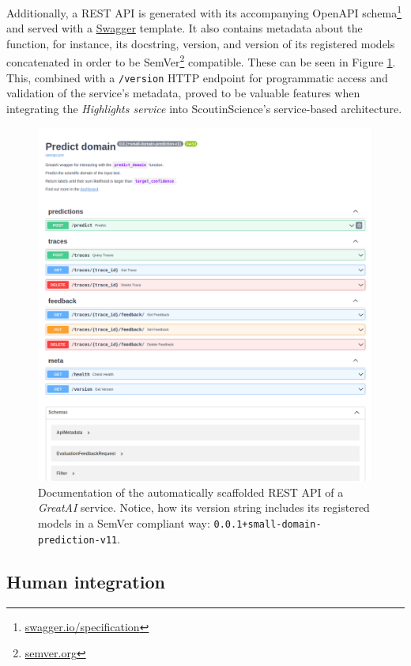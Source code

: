 Additionally, a REST API is generated with its accompanying OpenAPI schema\footnote{\href{https://swagger.io/specification}{swagger.io/specification}} and served with a \href{https://swagger.io/}{Swagger} template. It also contains metadata about the function, for instance, its docstring, version, and version of its registered models concatenated in order to be SemVer\footnote{\href{https://semver.org/}{semver.org}} compatible. These can be seen in Figure \ref{fig:greatai-api}. This, combined with a \texttt{/version} HTTP endpoint for programmatic access and validation of the service's metadata, proved to be valuable features when integrating the \textit{Highlights service} into ScoutinScience's service-based architecture.

\begin{figure}
    \centering
    \includegraphics[width=0.85\linewidth]{figures/greatai-api.png}
    \captionsetup{width=.9\linewidth}
    \caption{Documentation of the automatically scaffolded REST API of a \textit{GreatAI} service. Notice, how its version string includes its registered models in a SemVer compliant way: \texttt{0.0.1+small-domain-prediction-v11}.}
    \label{fig:greatai-api}
\end{figure}

\subsection{Human integration}

